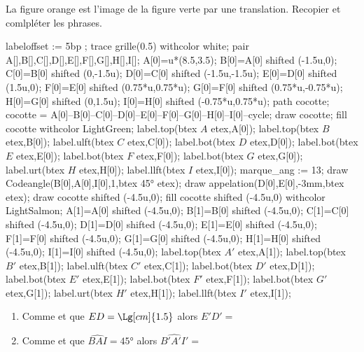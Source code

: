 \begin{exercice*}
    La figure orange est l'image de la figure verte par une translation. Recopier et comlpléter les phrases.
    \begin{Geometrie}[CoinHD={(9u,4u)}]
        labeloffset := 5bp ;
        trace grille(0.5) withcolor white;
        pair A[],B[],C[],D[],E[],F[],G[],H[],I[];
        A[0]=u*(8.5,3.5);
        B[0]=A[0] shifted (-1.5u,0);
        C[0]=B[0] shifted (0,-1.5u);
        D[0]=C[0] shifted (-1.5u,-1.5u);
        E[0]=D[0] shifted (1.5u,0);
        F[0]=E[0] shifted (0.75*u,0.75*u);
        G[0]=F[0] shifted (0.75*u,-0.75*u);
        H[0]=G[0] shifted (0,1.5u);
        I[0]=H[0] shifted (-0.75*u,0.75*u);
        path cocotte;
        cocotte = A[0]--B[0]--C[0]--D[0]--E[0]--F[0]--G[0]--H[0]--I[0]--cycle;
        draw cocotte;
        fill cocotte withcolor LightGreen;
        label.top(btex $A$ etex,A[0]);
        label.top(btex $B$ etex,B[0]);
        label.ulft(btex $C$ etex,C[0]);
        label.bot(btex $D$ etex,D[0]);
        label.bot(btex $E$ etex,E[0]);
        label.bot(btex $F$ etex,F[0]);
        label.bot(btex $G$ etex,G[0]);
        label.urt(btex $H$ etex,H[0]);
        label.llft(btex $I$ etex,I[0]);
        marque_ang := 13;
        draw Codeangle(B[0],A[0],I[0],1,btex \ang{45} etex);        
        draw appelation(D[0],E[0],-3mm,btex  etex);
        draw cocotte shifted (-4.5u,0);
        fill cocotte shifted (-4.5u,0) withcolor LightSalmon;
        A[1]=A[0] shifted (-4.5u,0);
        B[1]=B[0] shifted (-4.5u,0);
        C[1]=C[0] shifted (-4.5u,0);
        D[1]=D[0] shifted (-4.5u,0);
        E[1]=E[0] shifted (-4.5u,0);
        F[1]=F[0] shifted (-4.5u,0);
        G[1]=G[0] shifted (-4.5u,0);
        H[1]=H[0] shifted (-4.5u,0);
        I[1]=I[0] shifted (-4.5u,0);
        label.top(btex $A'$ etex,A[1]);
        label.top(btex $B'$ etex,B[1]);
        label.ulft(btex $C'$ etex,C[1]);
        label.bot(btex $D'$ etex,D[1]);
        label.bot(btex $E'$ etex,E[1]);
        label.bot(btex $F'$ etex,F[1]);
        label.bot(btex $G'$ etex,G[1]);
        label.urt(btex $H'$ etex,H[1]);
        label.llft(btex $I'$ etex,I[1]);
    \end{Geometrie}
    \begin{enumerate}
        \item Comme \makebox[0.1\linewidth]{\dotfill} et que $ED=\Lg[cm]{1.5}$ alors $E'D'=$\makebox[0.1\linewidth]{\dotfill}
        \item Comme \makebox[0.1\linewidth]{\dotfill} et que $\widehat{BAI}=\ang{45}$ alors $\widehat{B'A'I'}=$\makebox[0.1\linewidth]{\dotfill}
    \end{enumerate}
\end{exercice*}
